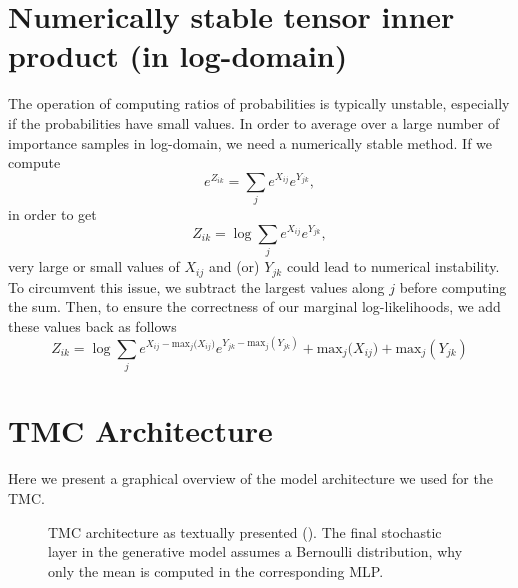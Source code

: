
    \section{Numerically stable tensor inner product (in log-domain)}


    \label{sec:appendix_tmul}
    The operation of computing ratios of probabilities is typically unstable, especially if the probabilities have small values. In order to average over a large number of importance samples in log-domain, we need a numerically stable method. If we compute    
    \begin{equation*}
        e^{Z_{ik}} = \sum_j e^{X_{ij}}e^{Y_{jk}},
    \end{equation*}
    in order to get
    \begin{equation*}
        Z_{ik} = \log \sum_j e^{X_{ij}}e^{Y_{jk}},
    \end{equation*}
    very large or small values of $X_{ij}$ and (or) $Y_{jk}$ could lead to numerical instability. To circumvent this issue, we subtract the largest values along $j$ before computing the sum. Then, to ensure the correctness of our marginal log-likelihoods, we add these values back as follows
    \begin{equation*}
        Z_{ik} = \log \sum_j e^{X_{ij} - \text{max}_j({X_{ij})}}e^{Y_{jk} - \text{max}_j(Y_{jk})} + \text{max}_j({X_{ij}) + \text{max}_j}(Y_{jk}) 
    \end{equation*}
    
    \section{TMC Architecture}
    \label{sec:appendix_tmc_arch}
    Here we present a graphical overview of the model architecture we used for the TMC.
    \begin{figure}[h]
    \begin{center}
    \end{center}
    \caption{TMC architecture as textually presented (\cite{tmc}). The final stochastic layer in the generative model assumes a Bernoulli distribution, why only the mean is computed in the corresponding MLP.}
    \label{fig:tmc_layout}
    \end{figure}
    
